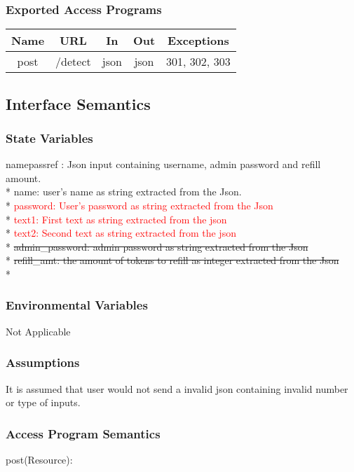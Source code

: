 \documentclass[12,english]{article}
\begin{document}
			\subsubsection{Exported Access Programs}
				\begin{tabular}[pos]{|c|c|c|c|c|}
					
					\hline
					\textbf{Name}& \textbf{URL} & \textbf{In} & \textbf{Out} & \textbf{Exceptions} \\ \hline
					post & \slash detect & json & json & 301, 302, 303 \\ \hline
					
				\end{tabular}
				
		\subsection{Interface Semantics}
			\subsubsection{State Variables}
			namepassref : Json input containing username, admin password and refill amount. \\* 
			name: user's name as string extracted from the Json.   \\*
			\textcolor{red}{password: User's password as string extracted from the Json} \\*
			\textcolor{red}{text1: First text as string extracted from the json} \\*
			\textcolor{red}{text2: Second text as string extracted from the json} \\*
			\st{admin\_password: admin password as string extracted from the Json }   \\*
			\st{refill\_amt: the amount of tokens to refill as integer extracted from the Json}  \\*
			\subsubsection{Environmental Variables}
			Not Applicable
			
			\subsubsection{Assumptions}
           It is assumed that user would not send a invalid json containing invalid number or type of inputs.
        
			\subsubsection{Access Program Semantics}
			post(Resource):
			
\end{document}
